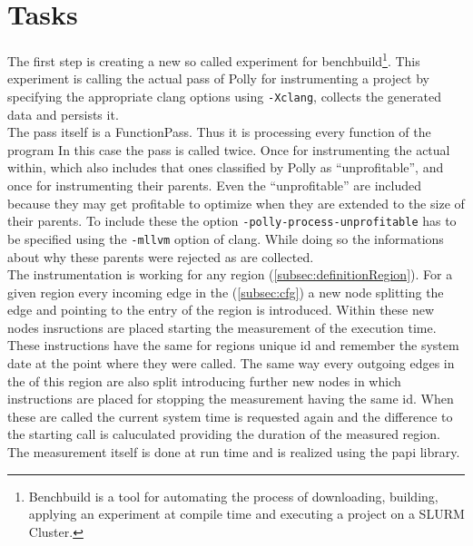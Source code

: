 \section{Tasks}
The first step is creating a new so called experiment for benchbuild\footnote{Benchbuild is a tool for automating the process of downloading, building, applying an experiment at compile time and executing a project on a SLURM Cluster.}.
This experiment is calling the actual pass of Polly for instrumenting a project by specifying the appropriate clang options using \texttt{-Xclang}, collects the generated data and persists it.\\
The pass itself is a FunctionPass.
Thus it is processing every function of the program
In this case the pass is called twice.
Once for instrumenting the actual \scops within, which also includes that ones classified by Polly as \enquote{unprofitable}, and once for instrumenting their parents.
Even the \enquote{unprofitable} \scops are included because they may get profitable to optimize when they are extended to the size of their parents.
To include these \scops the option \texttt{-polly-process-unprofitable} has to be specified using the \texttt{-mllvm} option of clang.
While doing so the informations about why these parents were rejected as \scops are collected.\\
The instrumentation is working for any region (\autoref{subsec:definitionRegion}).
For a given region every incoming edge in the \cfg (\autoref{subsec:cfg}) a new node splitting the edge and pointing to the entry of the region is introduced.
Within these new nodes insructions are placed starting the measurement of the execution time.
These instructions have the same for regions unique id and remember the system date at the point where they were called.
The same way every outgoing edges in the \cfg of this region are also split introducing further new nodes in which instructions are placed for stopping the measurement having the same id.
When these are called the current system time is requested again and the difference to the starting call is caluculated providing the duration of the measured region.
The measurement itself is done at run time and is realized using the papi library.
